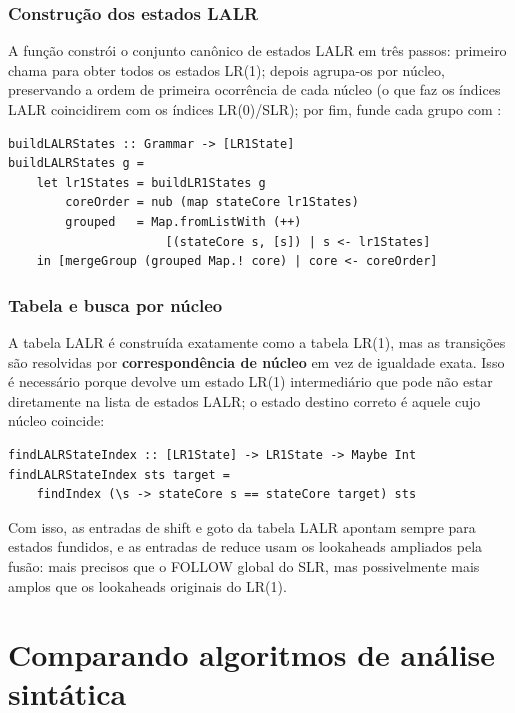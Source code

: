 \subsubsection{Construção dos estados LALR}

A função  constrói o
conjunto canônico de estados LALR em três passos: primeiro chama
 para obter todos os estados
LR(1); depois agrupa-os por núcleo, preservando a ordem de primeira
ocorrência de cada núcleo (o que faz os índices LALR coincidirem com
os índices LR(0)/SLR); por fim, funde cada grupo com
:

\begin{verbatim}
buildLALRStates :: Grammar -> [LR1State]
buildLALRStates g =
    let lr1States = buildLR1States g
        coreOrder = nub (map stateCore lr1States)
        grouped   = Map.fromListWith (++)
                      [(stateCore s, [s]) | s <- lr1States]
    in [mergeGroup (grouped Map.! core) | core <- coreOrder]
\end{verbatim}

\subsubsection{Tabela e busca por núcleo}

A tabela LALR é construída exatamente como a tabela LR(1), mas as
transições são resolvidas por \textbf{correspondência de núcleo} em
vez de igualdade exata. Isso é necessário porque
 devolve um estado
LR(1) intermediário que pode não estar diretamente na lista de
estados LALR; o estado destino correto é aquele cujo núcleo coincide:

\begin{verbatim}
findLALRStateIndex :: [LR1State] -> LR1State -> Maybe Int
findLALRStateIndex sts target =
    findIndex (\s -> stateCore s == stateCore target) sts
\end{verbatim}

Com isso, as entradas de shift e goto da tabela LALR apontam sempre
para estados fundidos, e as entradas de reduce usam os lookaheads
ampliados pela fusão: mais precisos que o FOLLOW global do SLR,
mas possivelmente mais amplos que os lookaheads originais do LR(1).

\section{Comparando algoritmos de análise sintática}

